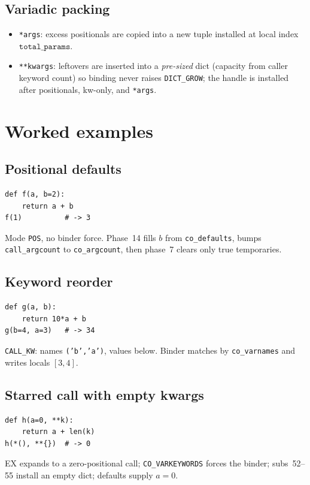\documentclass[11pt,a4paper]{article}
\begin{document}
\subsection{Variadic packing}
\begin{itemize}[leftmargin=*]
  \item \texttt{*args}: excess positionals are copied into a new tuple installed
    at local index $\texttt{total\_params}$.
  \item \texttt{**kwargs}: leftovers are inserted into a \emph{pre-sized} dict
    (capacity from caller keyword count) so binding never raises
    \texttt{DICT\_GROW}; the handle is installed after positionals, kw-only, and
    \texttt{*args}.
\end{itemize}

\section{Worked examples}

\subsection{Positional defaults}
\begin{lstlisting}
def f(a, b=2):
    return a + b
f(1)          # -> 3
\end{lstlisting}
Mode \texttt{POS}, no binder force.
Phase~14 fills $b$ from \texttt{co\_defaults}, bumps
\texttt{call\_argcount} to \texttt{co\_argcount}, then phase~7 clears only
true temporaries.

\subsection{Keyword reorder}
\begin{lstlisting}
def g(a, b):
    return 10*a + b
g(b=4, a=3)   # -> 34
\end{lstlisting}
\texttt{CALL\_KW}: names \texttt{('b','a')}, values below.
Binder matches by \texttt{co\_varnames} and writes locals $[3,4]$.

\subsection{Starred call with empty kwargs}
\begin{lstlisting}
def h(a=0, **k):
    return a + len(k)
h(*(), **{})  # -> 0
\end{lstlisting}
EX expands to a zero-positional call; \texttt{CO\_VARKEYWORDS} forces the
binder; subs~52--55 install an empty dict; defaults supply $a=0$.
\end{document}
